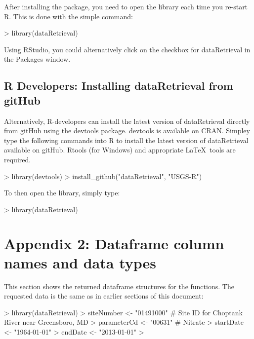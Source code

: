 \documentclass[a4paper,11pt]{article}
\begin{document}
After installing the package, you need to open the library each time you re-start R.  This is done with the simple command:
\begin{Schunk}
\begin{Sinput}
> library(dataRetrieval)
\end{Sinput}
\end{Schunk}
Using RStudio, you could alternatively click on the checkbox for dataRetrieval in the Packages window.

\subsection{R Developers: Installing dataRetrieval from gitHub}
Alternatively, R-developers can install the latest version of dataRetrieval directly from gitHub using the devtools package.  devtools is available on CRAN.  Simpley type the following commands into R to install the latest version of dataRetrieval available on gitHub.  Rtools (for Windows) and appropriate \LaTeX\ tools are required.

\begin{Schunk}
\begin{Sinput}
> library(devtools)
> install_github("dataRetrieval", "USGS-R")
\end{Sinput}
\end{Schunk}
To then open the library, simply type:

\begin{Schunk}
\begin{Sinput}
> library(dataRetrieval)
\end{Sinput}
\end{Schunk}

\newpage
\section{Appendix 2: Dataframe column names and data types}
This section shows the returned dataframe structures for the functions.  The requested data is the same as in earlier sections of this document:
\begin{Schunk}
\begin{Sinput}
> library(dataRetrieval)
> siteNumber <- "01491000" # Site ID for Choptank River near Greensboro, MD
> parameterCd <- "00631"  # Nitrate
> startDate <- "1964-01-01"
> endDate <- "2013-01-01"
> 
\end{Sinput}
\end{Schunk}
\end{document}
